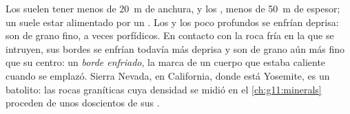 Los  suelen tener menos de \qty{20}{m} de anchura, y los ,
menos de \qty{50}{m} de espesor; un  suele estar alimentado por un
. Los  y los  poco profundos se enfrían deprisa: son de
grano fino, a veces porfídicos. En contacto con la roca fría en la que se
intruyen, sus bordes se enfrían todavía más deprisa y son de grano aún más
fino que su centro: un \emph{borde enfriado}, la marca de un cuerpo que estaba
caliente cuando se emplazó. Sierra Nevada, en California, donde está
Yosemite, es un batolito: las rocas graníticas cuya densidad se midió en el
\cref{ch:g11:minerals} proceden de unos doscientos de sus .

